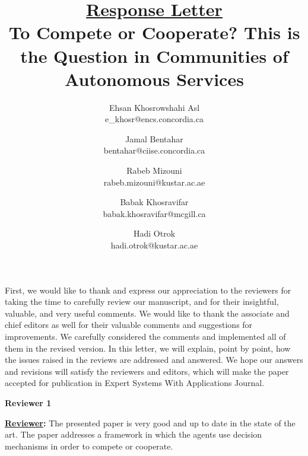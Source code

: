 \documentclass[times, 12pt,a4paper]{article}
\begin{document}

\newtheorem{definition}{Definition}
\newtheorem{proposition}{Proposition}
\newtheorem{example}{Example}
\newtheorem{lemma}{Lemma}
\newtheorem{theorem}{Theorem}
\newtheorem{corollary} {Corollary}
\title{\underline{Response Letter}\\\vspace{0.5cm}To Compete or Cooperate? This is the Question in Communities of Autonomous Services}
\author{Ehsan Khosrowshahi Asl\\
e\_khosr@encs.concordia.ca\\
\and
Jamal Bentahar\\
bentahar@ciise.concordia.ca \\
\and
Rabeb Mizouni\\
rabeb.mizouni@kustar.ac.ae \\
\and
Babak Khosravifar\\
babak.khosravifar@mcgill.ca \\
\and
Hadi Otrok\\
hadi.otrok@kustar.ac.ae \\
}


\maketitle


First, we would like to thank and express our appreciation to the
reviewers for taking the time to carefully review our manuscript,
and for their insightful, valuable, and very useful comments. We
would like to thank the associate and chief editors as well for
their valuable comments and suggestions for improvements. We
carefully considered the comments and implemented all of them in
the revised version. In this letter, we will explain, point by
point, how the issues raised in the reviews are addressed and
answered. We hope our answers and revisions will satisfy the
reviewers and editors, which will make the paper accepted for
publication in Expert Systems With Applications Journal.\\


\begin{center}
  \textbf{Reviewer 1}
\end{center}


\textbf{\underline{Reviewer}:} The presented paper is very good and up to date in the state of the art. The paper addresses a framework in which the agents use decision mechanisms in order to compete or cooperate.
\end{document}
